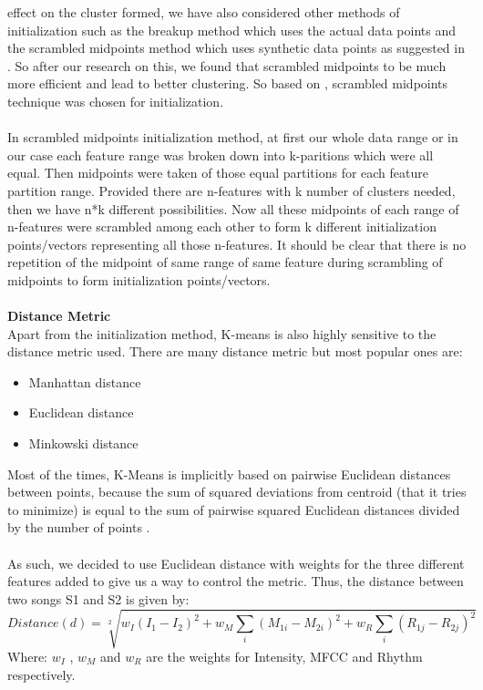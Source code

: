 {effect on the cluster formed, we have also considered other methods of initialization such as the breakup method which uses the actual data points
and the scrambled midpoints method which uses synthetic data points as suggested in \cite{prasad2007}. So after our research on this, we found that 
scrambled midpoints to be much more efficient and lead to better clustering. So based on \cite{Apon2006}, scrambled midpoints technique was
chosen for initialization.\\
\\ 
In scrambled midpoints initialization method, at first our whole data range or in our case each feature range was broken down into k-paritions which were
all equal. Then midpoints were taken of those equal partitions for each feature partition range. Provided there are n-features with k
number of clusters needed, then we have n*k different possibilities. Now all these midpoints of each range of n-features were scrambled among
each other to form k different initialization points/vectors representing all those n-features. It should be clear that there is no repetition of the midpoint of same range 
of same feature during scrambling of midpoints to form initialization points/vectors.\\  
\\
\textbf{Distance Metric}\\
Apart from the initialization method, K-means is also highly sensitive to the distance metric used. There are many distance metric but most popular ones are: 
\begin{itemize}
        \item Manhattan distance
        \item Euclidean distance
        \item Minkowski distance
\end{itemize}
Most of the times, K-Means is implicitly based on pairwise Euclidean distances between points, because the sum of squared deviations from centroid (that it tries to minimize) is equal
to the sum of pairwise squared Euclidean distances divided by the number of points \cite{Neumayer2004}.\\ 
\\
As such, we decided to use Euclidean distance with weights for the three different features added to give us a way to control the metric. Thus, the
distance between two songs S1 and S2 is given by: 
\begin{equation}
        Distance(d)=\sqrt[2]{w_I(I_1-I_2)^2+w_M\sum_{i}{(M_{1i}-M_{2i})^2}+w_R\sum_{i}{(R_{1j}-R_{2j})^2}}
\end{equation}
Where: $w_I$ , $w_M$  and $w_R$ are the weights for Intensity, MFCC and Rhythm respectively. 

}
